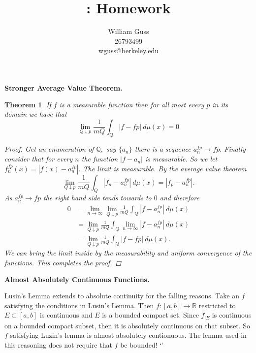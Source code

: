 \documentclass[letter]{article}
\title{\bCLASS: Homework \bHWN}
\author{William Guss\\26793499\\wguss@berkeley.edu}
\newtheorem{theorem}{Theorem}
\newenvironment{menumerate}{%
  \edef\backupindent{\the\parindent}%
  \enumerate%
  \setlength{\parindent}{\backupindent}%
}{\endenumerate}
\begin{document}
\maketitle
\thispagestyle{empty}


\begin{menumerate}
	\setcounter{enumi}{80}
	\item \textbf{Stronger Average Value Theorem.}
	\begin{theorem}
		If $f$ is a measurable function then for all most every $p$ in its domain we have that 
		\begin{equation}
			\lim_{Q\downarrow p} \frac{1}{mQ} \int_Q |f- fp|\ d\mu(x) = 0
		\end{equation}
		\begin{proof}
			Get an enumeration of $\mathbb{Q},$ say $\{a_n\}$ there is a sequence $a^{fp}_n \to fp.$ Finally
			consider that for every $n$ the function $|f -a_n|$ is measurable. So we let $f_n^{fp}(x) = |f(x) - a^{fp}_n|.$
			The limit is measurable. By the average value theorem
			\begin{equation}
				\lim_{Q\downarrow p} \frac{1}{mQ} \int_Q |f_n-  a^{fp}_n|\ d\mu(x) = |f_p - a^{fp}_n|.
			\end{equation}
			As $ a^{fp}_n\to fp$ the right hand side  tends towards to $0$ and therefore
			 \begin{equation}
			 	\begin{aligned}
					0 &= \lim_{ n\to \infty}\lim_{Q\downarrow p} \frac{1}{mQ} \int_Q |f- a^{fp}_n|\ d\mu(x)  \\
					&=  \lim_{Q\downarrow p}  \frac{1}{mQ} \int_Q \lim_{ n\to \infty} |f- a^{fp}_n|\ d\mu(x)  \\
					&= \lim_{Q\downarrow p} \frac{1}{mQ} \int_Q |f- fp|\ d\mu(x) .
			 	\end{aligned}
			 \end{equation}
			 We can bring the limit inside by the measurability and uniform convergence of the functions.
			 This completes the proof.

		\end{proof}
	\end{theorem}


	\setcounter{enumi}{83}
	\item \textbf{Almost Absolutely Continuous Functions.}

	Lusin's Lemma extends to absolute continuity for the falling reasons. Take an $f$ satisfying the conditions in Lusin's Lemma. Then $f:[a,b] \to \mathbb{R}$ restricted to $E \subset [a,b]$ is continuous and $E$ is a bounded compact set. Since $f_{|E}$ is continuous on a bounded compact subset, then it is absolutely continuous on that subset. So $f$ satisfying Luzin's lemma is almost absolutely contionuous.
	The lemma used in this reasoning does not require that $f$ be bounded! `'


\end{menumerate}
\end{document}
